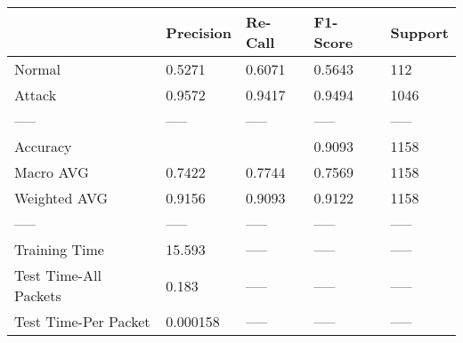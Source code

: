 \begin{tabular}{lllll}
\toprule
{} & Precision & Re-Call & F1-Score & Support \\
\midrule
Normal                &    0.5271 &  0.6071 &   0.5643 &     112 \\
Attack                &    0.9572 &  0.9417 &   0.9494 &    1046 \\
-----                 &     ----- &   ----- &    ----- &   ----- \\
Accuracy              &           &         &   0.9093 &    1158 \\
Macro AVG             &    0.7422 &  0.7744 &   0.7569 &    1158 \\
Weighted AVG          &    0.9156 &  0.9093 &   0.9122 &    1158 \\
-----                 &     ----- &   ----- &    ----- &   ----- \\
Training Time         &    15.593 &   ----- &    ----- &   ----- \\
Test Time-All Packets &     0.183 &   ----- &    ----- &   ----- \\
Test Time-Per Packet  &  0.000158 &   ----- &    ----- &   ----- \\
\bottomrule
\end{tabular}
